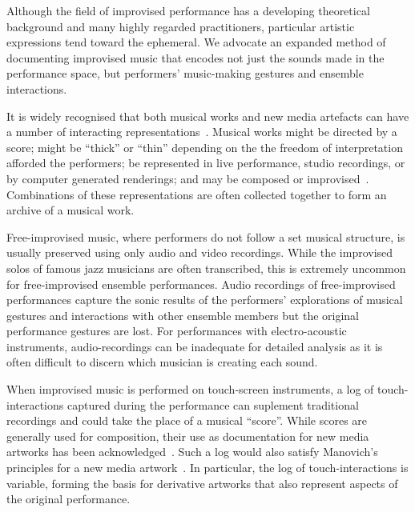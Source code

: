 \documentclass[graybox]{svmult}
\begin{document}
Although the field of improvised performance has a developing
theoretical background and many highly regarded practitioners,
particular artistic expressions tend toward the ephemeral. We advocate
an expanded method of documenting improvised music that encodes not
just the sounds made in the performance space, but performers'
music-making gestures and ensemble interactions.

It is widely recognised that both musical works and new media
artefacts can have a number of interacting
representations~\cite{Rinehart:2007pi}. Musical works might be
directed by a score; might be ``thick'' or ``thin'' depending on the
the freedom of interpretation afforded the performers; be represented
in live performance, studio recordings, or by computer generated
renderings; and may be composed or improvised~\cite{Davies:2005fj}.
Combinations of these representations are often collected together to
form an archive of a musical work.

Free-improvised music, where performers do not follow a set musical
structure, is usually preserved using only audio and video recordings.
While the improvised solos of famous jazz musicians are often
transcribed, this is extremely uncommon for free-improvised ensemble
performances. Audio recordings of free-improvised performances capture
the sonic results of the performers' explorations of musical gestures
and interactions with other ensemble members but the original
performance gestures are lost. For performances with electro-acoustic
instruments, audio-recordings can be inadequate for detailed analysis
as it is often difficult to discern which musician is creating each
sound.

When improvised music is performed on touch-screen instruments, a log
of touch-interactions captured during the performance can suplement
traditional recordings and could take the place of a musical
``score''. While scores are generally used for composition, their use
as documentation for new media artworks has been
acknowledged~\cite{MacDonald:2009ve}. Such a log would also satisfy
Manovich's principles for a new media artwork~\cite{Manovich:2002ly}.
In particular, the log of touch-interactions is variable, forming the
basis for derivative artworks that also represent aspects of the
original performance.
\end{document}
